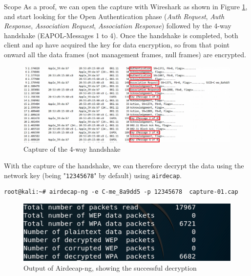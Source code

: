 \begin{chaptercover}{Scope}
As a proof, we can open the capture with Wireshark as shown in Figure \ref{fig:traffic-analysis-wpa-handshake}, and start looking for the Open Authentication phase (\textit{Auth Request}, \textit{Auth Response}, \textit{Association Request}, \textit{Association Response}) followed by the 4-way handshake (EAPOL-Messages 1 to 4). Once the handshake is completed, both client and \acrshort{ap} have acquired the key for data encryption, so from that point onward all the data frames (not management frames, null frames) are encrypted.

\begin{figure}[H]
  \centering
  \includegraphics[width=\linewidth]{figures/traffic-analysis-wpa-handshake}
  \caption{Capture of the 4-way handshake}
  \label{fig:traffic-analysis-wpa-handshake}
\end{figure}

With the capture of the handshake, we can therefore decrypt the data using the network key (being "\texttt{12345678}" by default) using \texttt{airdecap}.

\begin{center}
\begin{minipage}{.75\linewidth}
\begin{lstlisting}
root@kali:~# airdecap-ng -e C-me_8a9dd5 -p 12345678  capture-01.cap
\end{lstlisting}
\end{minipage}
\end{center}

\begin{figure}[H]
  \centering
  \includegraphics[width=.6\linewidth]{figures/traffic-analysis-airdecap-ng}
  \caption{Output of Airdecap-ng, showing the successful decryption}
  \label{fig:traffic-analysis-airdecap-ng}
\end{figure}


\end{chaptercover}
